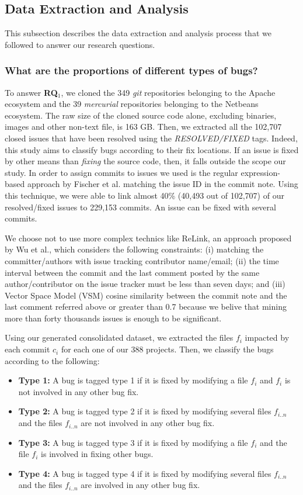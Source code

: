 
\subsection{Data Extraction and Analysis}

This subsection describes the data extraction and analysis process that we followed to answer our research questions.

\subsubsection{What are the proportions of different types of bugs?} To answer {\bf RQ$_1$}, we cloned the 349 {\it git} repositories belonging to the Apache ecosystem and the 39 {\it mercurial} repositories belonging to the Netbeans ecosystem.
The raw size of the cloned source code alone, excluding binaries, images and other non-text file, is 163 GB.
Then, we extracted all the 102,707 closed issues that have been resolved using the {\it RESOLVED/FIXED} tags.
Indeed, this study aims to classify bugs according to their fix locations.
If an issue is fixed by other means than {\it fixing} the source code, then, it falls outside the scope our study.
In order to assign commits to issues we used is the regular expression-based approach by Fischer et al. \cite{Fischer} matching the issue ID in the commit note.
Using this technique, we were able to link almost 40\% (40,493 out of 102,707) of our resolved/fixed issues to 229,153 commits.
An issue can be fixed with several commits.

We choose not to use more complex technics like ReLink, an approach proposed by Wu et al.\cite{Wu2011}, which considers the following constraints: (i) matching the committer/authors with issue tracking contributor name/email; (ii) the time interval between the commit and the last comment posted by the same author/contributor on the issue tracker must be less than seven days; and (iii) Vector Space Model (VSM) cosine similarity between the commit note and the last comment referred above or greater than 0.7 because we belive that mining more than forty thousands issues is enough to be significant.

Using our generated consolidated dataset, we extracted the files $f_i$ impacted by each commit $c_i$ for each one of our 388 projects.
Then, we classify the bugs according to the following:

\begin{itemize}
  \item {\bf Type 1:} A bug is tagged type 1 if it is fixed by modifying a file $f_i$ and $f_i$ is not involved in any other bug fix.
  \item {\bf Type 2:} A bug is tagged type 2 if it is fixed by modifying several files $f_{i..n}$ and the files $f_{i..n}$ are not involved in any other bug fix.
  \item {\bf Type 3:} A bug is tagged type 3 if it is fixed by modifying a file $f_{i}$ and the file $f_{i}$ is involved in fixing other bugs.
  \item {\bf Type 4:} A bug is tagged type 4 if it is fixed by modifying several files $f_{i..n}$ and the files $f_{i..n}$ are involved in any other bug fix.
\end{itemize}

